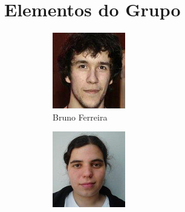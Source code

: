 \documentclass[11pt, a4paper, oneside]{article}
\begin{document}
\newpage
\section{Elementos do Grupo}
\begin{figure}[h!]
\centering
\begin{subfigure}{.33\textwidth}
  \centering
  \includegraphics[width=0.8\linewidth]{60}
  \caption{Bruno Ferreira  }
\end{subfigure}%
\begin{subfigure}{.33\textwidth}
  \centering
  \includegraphics[width=0.8\linewidth]{107}

\end{subfigure}
\end{figure}
\end{document}
